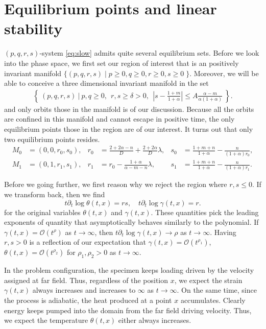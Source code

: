 \documentclass[a4paper,11pt]{article}
\begin{document}
\section{Equilibrium points and linear stability} \label{sec:equil}
$(p,q,r,s)$-system \eqref{eq:slow} admits quite several equilibrium sets. Before we look into the phase space, we first set our region of interest that is an positively invariant manifold $\{(p,q,r,s) \; | \; p\ge0, q\ge0, r\ge0, s\ge0 \;\}$. Moreover, we will be able to conceive a three dimensional invariant manifold in the set
\begin{align*}
 \left\{ \: (p,q,r,s) \: | \:  p,q\ge0, ~~ r,s\ge\delta>0, ~~\left|s-\frac{1+m}{1+\alpha}\right| \le A \frac{\alpha-m}{\alpha(1+\alpha)}\: \right\}.
\end{align*}
and only orbits those in the manifold is of our discussion. Because all the orbits are confined in this manifold and cannot escape in positive time, the only equilibrium points those in the region are of our interest. It turns out that only two equilibrium points resides.
\begin{align*}
 M_0 &= (0,0,r_0,s_0), & r_0 &=\frac{2+2\alpha-n}{D} + \frac{2+2\alpha}{D}\lambda, & s_0&=\frac{1+m+n}{1+\alpha} - \frac{n}{(1+\alpha)r_0},\\
 M_1 &= (0,1,r_1,s_1), & r_1 &= r_0-\frac{1+\alpha}{\alpha-m-n}\lambda, & s_1&=\frac{1+m+n}{1+\alpha} - \frac{n}{(1+\alpha)r_1}.
\end{align*}

Before we going further, we first reason why we reject the region where $r,s\le0$. If we transform back, then we find
\begin{equation*}
 t\partial_t \log \theta(t,x) = rs, \quad t\partial_t\log \gamma(t,x) = r.
\end{equation*}
for the original variables $\theta(t,x)$ and $\gamma(t,x)$. These quantities pick the leading exponents of quantity that asymptotically behaves similarly to the polynomial. If $\gamma(t,x) = \mathcal{O}(t^\rho)$ as $t \rightarrow \infty$, then $t\partial_t\log \gamma(t,x) \rightarrow \rho$ as $t \rightarrow \infty$. Having $r,s>0$ is a reflection of our expectation that $\gamma(t,x) = \mathcal{O}(t^{\rho_1})$, $\theta(t,x) = \mathcal{O}(t^{\rho_2})$ for $\rho_1,\rho_2 >0$ as $t \rightarrow \infty$.

In the problem configuration, the specimen keeps loading driven by the velocity assigned at far field. Thus, regardless of the position $x$, we expect the strain $\gamma(t,x)$ always increases and increases to  $\infty$ as $t \rightarrow\infty$. On the same time, since the process is adiabatic, the heat produced at a point $x$ accumulates. Clearly energy keeps pumped into the domain from the far field driving velocity. Thus, we expect the temperature $\theta(t,x)$ either always increases.
\end{document}
